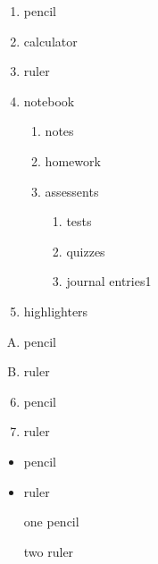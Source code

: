\documentclass[11pt]{article}
\begin{document}
\begin{enumerate}
\item pencil 
\item calculator
\item ruler
\item notebook 
	\begin{enumerate}
		\item notes
		\item homework 
		\item assessents
		\begin{enumerate}
			\item tests
			\item quizzes
			\item journal entries1
		\end{enumerate}
	\end{enumerate}
\item highlighters
\end{enumerate}


\vspace{1cm}
\begin{enumerate} [A.]
	\item pencil 
	\item ruler
\end{enumerate}





\begin{enumerate}\setcounter{enumi}{5}
	\item pencil 
	\item ruler
\end{enumerate}




\begin{itemize}
	\item pencil 
	\item ruler
\end{itemize}


\begin{enumerate}
	\item[one] pencil 
	\item[two] ruler
\end{enumerate}
\end{document}

